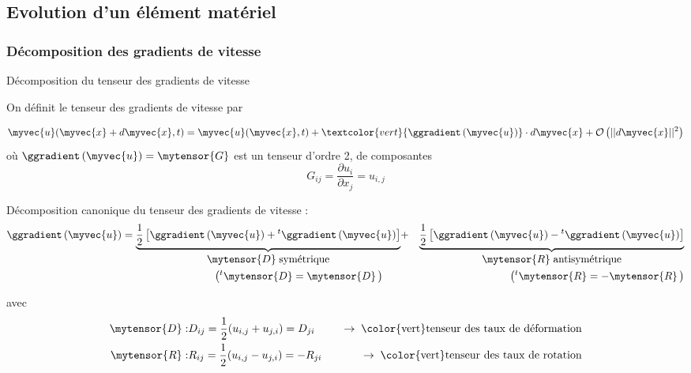 \subsection{Evolution d'un élément matériel}

\subsubsection{Décomposition des gradients de vitesse}
\begin{frame}{Décomposition du tenseur des gradients de vitesse}

\small
On définit le \textcolor{vert}{tenseur des gradients de vitesse} par

\[
	\myvec{u}(\myvec{x}+d\myvec{x}, t) 
	= \myvec{u}(\myvec{x}, t) + \textcolor{vert}{\ggradient\,(\myvec{u})} \cdot d\myvec{x} 
	+ \mathcal{O}\left(||d\myvec{x}||^2\right)
\]
où $\ggradient\,(\myvec{u}) = \mytensor{G}$ est un tenseur d'ordre 2, de composantes 
\[
	G_{ij} = \dfrac{\partial u_i}{\partial x_j} = u_{i, j}
\]

\pause

\medskip
Décomposition canonique du tenseur des gradients de vitesse :
\begin{eqnarray*}
\ggradient\,(\myvec{u}) 
= 
\underbrace{\dfrac{1}{2} \left [ \ggradient\,(\myvec{u}) + {}^t\ggradient\,(\myvec{u})
                         \right ]}_{\displaystyle \mytensor{D} \; \mbox{symétrique}}
& + &
\underbrace{\dfrac{1}{2} \left [ \ggradient\,(\myvec{u}) - {}^t\ggradient\,(\myvec{u})                          									\right ]}_{\displaystyle \mytensor{R} \; \mbox{antisymétrique}}
\\
\left ({}^t\mytensor{D}=\mytensor{D} \, \right) \hspace{6mm} 
& & 
\hspace{9mm} \left ({}^t\mytensor{R}=-\mytensor{R} \, \right )
\end{eqnarray*}

avec 
\begin{eqnarray*}
\mytensor{D} : & D_{ij} = \dfrac{1}{2} (u_{i, j} + u_{j, i}) = D_{ji} &
\quad \rightarrow \; \mbox{\color{vert}tenseur des taux de déformation}
\\
\mytensor{R} : & R_{ij} = \dfrac{1}{2} (u_{i, j} - u_{j, i}) = -R_{ji} &
\quad \rightarrow \; \mbox{\color{vert}tenseur des taux de rotation}
\end{eqnarray*}

\vspace{0mm}

\end{frame}

